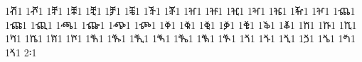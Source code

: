 {1ⶥ1 %
1ⶦ1 %
1ⶨ1 %
1ⶩ1 %
1ⶪ1 %
1ⶫ1 %
1ⶬ1 %
1ⶭ1 %
1ⶮ1 %
1ⶰ1 %
1ⶱ1 %
1ⶲ1 %
1ⶳ1 %
1ⶴ1 %
1ⶵ1 %
1ⶶ1 %
1ⶸ1 %
1ⶹ1 %
1ⶺ1 %
1ⶻ1 %
1ⶼ1 %
1ⶽ1 %
1ⶾ1 %
1ⷀ1 %
1ⷁ1 %
1ⷂ1 %
1ⷃ1 %
1ⷄ1 %
1ⷅ1 %
1ⷆ1 %
1ⷈ1 %
1ⷉ1 %
1ⷊ1 %
1ⷋ1 %
1ⷌ1 %
1ⷍ1 %
1ⷎ1 %
1ⷐ1 %
1ⷑ1 %
1ⷒ1 %
1ⷓ1 %
1ⷔ1 %
1ⷕ1 %
1ⷖ1 %
1ⷘ1 %
1ⷙ1 %
1ⷚ1 %
1ⷛ1 %
1ⷜ1 %
1ⷝ1 %
1ⷞ1 %
2፡1 %
}